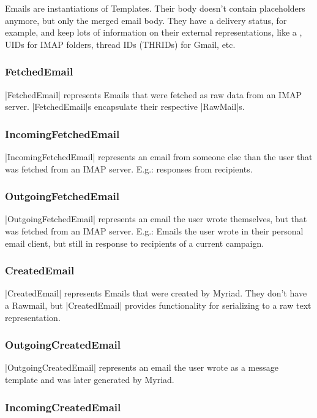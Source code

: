 Emails are instantiations of Templates. Their body doesn’t contain placeholders anymore, but only the merged email body. They have a delivery status, for example, and keep lots of information on their external representations, like a , UIDs for IMAP folders, thread IDs (THRIDs) for Gmail, etc.

\subsubsection{FetchedEmail}

|FetchedEmail| represents Emails that were fetched as raw data from an IMAP server. |FetchedEmail|s encapsulate their respective |RawMail|s.

\subsubsection{IncomingFetchedEmail}

|IncomingFetchedEmail| represents an email from someone else than the user that was fetched from an IMAP server. E.g.: responses from recipients.

\subsubsection{OutgoingFetchedEmail}

|OutgoingFetchedEmail| represents an email the user wrote themselves, but that was fetched from an IMAP server. E.g.: Emails the user wrote in their personal email client, but still in response to recipients of a current campaign.

\subsubsection{CreatedEmail}

|CreatedEmail| represents Emails that were created by Myriad. They don't have a Rawmail, but |CreatedEmail| provides functionality for serializing to a raw text representation.

\subsubsection{OutgoingCreatedEmail}

|OutgoingCreatedEmail| represents an email the user wrote as a message template  and was later generated by Myriad.

\subsubsection{IncomingCreatedEmail}

